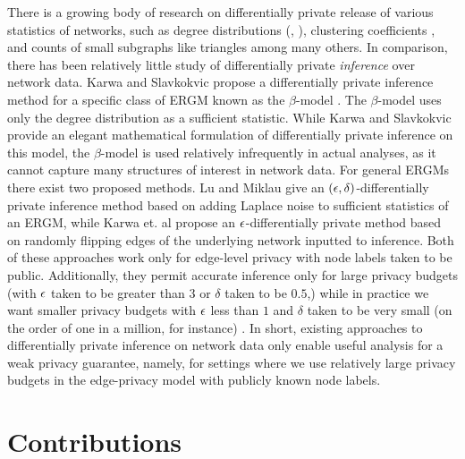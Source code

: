 There is a growing body of research on differentially private release of various statistics of networks, such as degree distributions (\cite{HLMJ09}, \cite{WNM16}), clustering coefficients \cite{WWZX12}, and counts of small subgraphs like triangles \cite{KRSY14} among many others. In comparison, there has been relatively little study of differentially private \emph{inference} over network data. Karwa and Slavkokvic propose a differentially private inference method for a specific class of ERGM known as the $\beta$-model \cite{KS16}. The $\beta$-model uses only the degree distribution as a sufficient statistic. While Karwa and Slavkokvic provide an elegant mathematical formulation of differentially private inference on this model, the $\beta$-model is used relatively infrequently in actual analyses, as it cannot capture many structures of interest in network data. For general ERGMs there exist two proposed methods. Lu and Miklau \cite{LM14} give an $(\epsilon, \delta)$-differentially private inference method based on adding Laplace noise to sufficient statistics of an ERGM, while Karwa et. al \cite{KKS17} propose an $\epsilon$-differentially private method based on randomly flipping edges of the underlying network inputted to inference. Both of these approaches work only for edge-level privacy with node labels taken to be public. Additionally, they permit accurate inference only for large privacy budgets (with $\epsilon$ taken to be greater than $3$ or $\delta$ taken to be $0.5$,) while in practice we want smaller privacy budgets with $\epsilon$ less than $1$ and $\delta$ taken to be very small (on the order of one in a million, for instance) \cite{N17}. In short, existing approaches to differentially private inference on network data only enable useful analysis for a weak privacy guarantee, namely, for settings where we use relatively large privacy budgets in the edge-privacy model with publicly known node labels. 

\section{Contributions}

